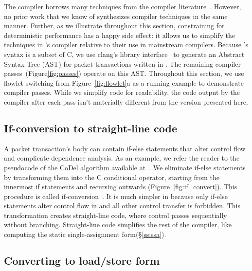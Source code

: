 The \pktlanguage compiler borrows many techniques from the compiler
literature~\cite{muchnik}. However, no prior work that we know of synthesizes
compiler techniques in the same manner. Further, as we illustrate throughout
this section, constraining \pktlanguage for deterministic performance has a
happy side effect: it allows us to simplify the techniques in \pktlanguage's
compiler relative to their use in mainstream compilers. Because \pktlanguage's
syntax is a subset of C, we use clang's library interface~\cite{libclang} to
generate an Abstract Syntax Tree (AST) for packet transactions written in
\pktlanguage. The remaining compiler passes~(Figure\ref{fig:passes}) operate on
this AST. Throughout this section, we use flowlet switching from
Figure~\ref{fig:flowlet}a as a running example to demonstrate compiler passes.
While we simplify code for readability, the code output by the \pktlanguage
compiler after each pass isn't materially different from the version presented
here.

\subsection{If-conversion to straight-line code}
A packet transaction's body can contain if-else statements that alter control
flow and complicate dependence analysis. As an example, we refer the reader to
the pseudocode of the CoDel algorithm available at~\cite{codel_code}. We
eliminate if-else statements by transforming them into the C conditional
operator, starting from the innermost if statements and recursing outwards
(Figure~\ref{fig:if_convert}). This procedure is called
if-conversion~\cite{if_conversion}. It is much simpler in \pktlanguage because
only if-else statements alter control flow in \pktlanguage and all other
control transfer is forbidden.  This transformation creates straight-line code,
where control passes sequentially without branching.  Straight-line code
simplifies the rest of the compiler, like computing the static
single-assignment form(\S\ref{ss:ssa}).

\subsection{Converting to load/store form}

